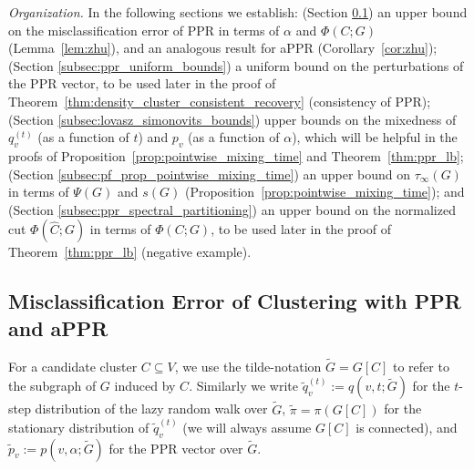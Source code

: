 \documentclass[twoside,11pt]{article}
\newcommand{\1}{\mathbf{1}}
\newcommand{\wt}[1]{\widetilde{#1}}
\newcommand{\wh}[1]{\widehat{#1}}
\begin{document}
\emph{Organization.} In the following sections we establish: (Section \ref{subsec:pf_lem_zhu}) an upper bound on the misclassification error of PPR in terms of $\alpha$ and $\Phi(C;G)$ (Lemma~\ref{lem:zhu}), and an analogous result for aPPR (Corollary~\ref{cor:zhu}); (Section \ref{subsec:ppr_uniform_bounds}) a uniform bound on the perturbations of the PPR vector, to be used later in the proof of Theorem~\ref{thm:density_cluster_consistent_recovery} (consistency of PPR);  (Section \ref{subsec:lovasz_simonovits_bounds}) upper bounds on the mixedness of $q_v^{(t)}$ (as a function of $t$) and $p_v$ (as a function of $\alpha$), which will be helpful in the proofs of Proposition~\ref{prop:pointwise_mixing_time} and Theorem~\ref{thm:ppr_lb}; (Section \ref{subsec:pf_prop_pointwise_mixing_time}) an upper bound on $\tau_{\infty}(G)$ in terms of $\Psi(G)$ and $s(G)$ (Proposition~\ref{prop:pointwise_mixing_time}); and (Section \ref{subsec:ppr_spectral_partitioning}) an upper bound on the normalized cut $\Phi(\wh{C};G)$ in terms of $\Phi(C;G)$, to be used later in the proof of Theorem~\ref{thm:ppr_lb} (negative example). 

\subsection{Misclassification Error of Clustering with PPR and aPPR}
\label{subsec:pf_lem_zhu}
For a candidate cluster $C \subseteq V$, we use the tilde-notation $\wt{G} = G[C]$ to refer to the subgraph of $G$ induced by $C$. Similarly we write $\wt{q}_v^{(t)} := q(v,t;\wt{G})$ for the $t$-step distribution of the lazy random walk over $\wt{G}$, $\wt{\pi} = \pi(G[C])$ for the stationary distribution of $\wt{q}_v^{(t)}$ (we will always assume $G[C]$ is connected), and $\wt{p}_v := p(v,\alpha;\wt{G})$ for the PPR vector over $\wt{G}$. \\
\end{document}
